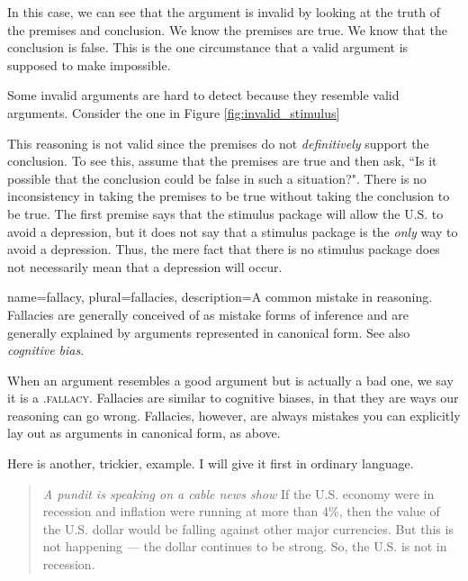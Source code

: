 In this case, we can see that the argument is invalid by looking at the truth of the premises and conclusion. We know the premises are true. We know that the conclusion is false. This is the one circumstance that a valid argument is supposed to make impossible.

Some invalid arguments are hard to detect because they resemble valid arguments. Consider the one in Figure \ref{fig:invalid_stimulus}

\begin{kormanize}
\end{kormanize}


This reasoning is not valid since the premises do not \textit{definitively} support the conclusion. To see this, assume that the premises are true and then ask, ``Is it possible that the conclusion could be false in such a situation?". There is no inconsistency in taking the premises to be true without taking the conclusion to be true. The first premise says that the stimulus package will allow the U.S. to avoid a depression, but it does not say that a stimulus package is the \textit{only }way to avoid a depression. Thus, the mere fact that there is no stimulus package does not necessarily mean that a depression will occur.

{
name=fallacy,
plural=fallacies,
description={A common mistake in reasoning. Fallacies are generally conceived of as mistake forms of inference and are generally explained by arguments represented in canonical form. See also \emph{cognitive bias}.}
}

When an argument resembles a good argument but is actually a bad one, we say it is a .\textsc{\gls{fallacy}}\label{def:fallacy}. Fallacies are similar to cognitive biases, in that they are ways our reasoning can go wrong.  Fallacies, however, are always mistakes you can explicitly lay out as arguments in canonical form, as above.

Here is another, trickier, example. I will give it first in ordinary language.

\begin{quote} \noindent\textit{A pundit is speaking on a cable news show} If the U.S. economy were in recession and inflation were running at more than 4\%, then the value of the U.S. dollar would be falling against other major currencies. But this is not happening --- the dollar continues to be strong. So, the U.S. is not in recession. \end{quote}

